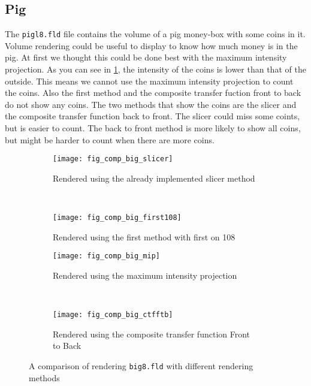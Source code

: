 \subsection{Pig}
The \texttt{pigl8.fld} file contains the volume of a pig money-box with some coins in it.
Volume rendering could be useful to display to know how much money is in the pig.
At first we thought this could be done best with the maximum intensity projection.
As you can see in \ref{fig:comp:big}, the intensity of the coins is lower than that of the outside. 
This means we cannot use the maximum intensity projection to count the coins. 
Also the first method and the composite transfer fuction front to back do not show any coins. 
The two methods that show the coins are the slicer and the composite transfer function back to front. 
The slicer could miss some coints, but is easier to count. 
The back to front method is more likely to show all coins, but might be harder to count when there are more coins. 
\begin{figure}[H]
	\centering
	\begin{subfigure}[t]{0.45\textwidth}
		\texttt{[image: fig\_comp\_big\_slicer]}
		\caption{Rendered using the already implemented slicer method}
	\end{subfigure}
	~%
	\begin{subfigure}[t]{0.45\textwidth}
		\texttt{[image: fig\_comp\_big\_first108]}
		\caption{Rendered using the first method with first on 108}
	\end{subfigure}
	
	\begin{subfigure}[t]{0.45\textwidth}
		\texttt{[image: fig\_comp\_big\_mip]}
		\caption{Rendered using the maximum intensity projection}
	\end{subfigure}
	~%
	\begin{subfigure}[t]{0.45\textwidth}
		\texttt{[image: fig\_comp\_big\_ctfftb]}
		\caption{Rendered using the composite transfer function Front to Back}
	\end{subfigure}
	\caption{A comparison of rendering \texttt{big8.fld} with different rendering methods}
	\label{fig:comp:big}
\end{figure}
	
